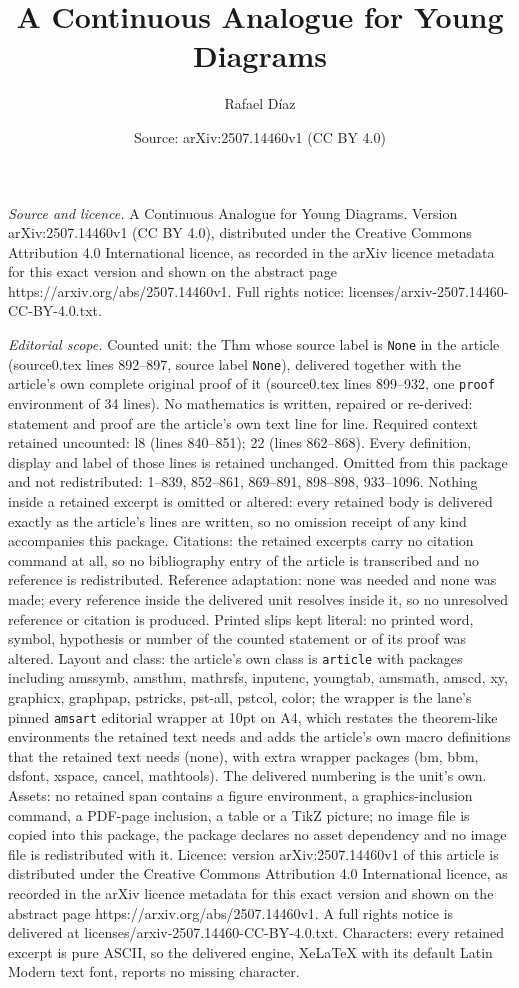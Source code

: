 \documentclass[10pt,a4paper]{amsart}
\title[A Continuous Analogue for Young Diagrams]{A Continuous Analogue for Young Diagrams}
\author{Rafael D\'iaz}
\date{Source: arXiv:2507.14460v1 (CC BY 4.0)}
\begin{document}
\maketitle

\noindent\emph{Source and licence.} A Continuous Analogue for Young Diagrams. Version arXiv:2507.14460v1 (CC BY 4.0), distributed under the Creative Commons Attribution 4.0 International licence, as recorded in the arXiv licence metadata for this exact version and shown on the abstract page https://arxiv.org/abs/2507.14460v1. Full rights notice: licenses/arxiv-2507.14460-CC-BY-4.0.txt.\par\smallskip

\noindent\textit{Editorial scope.} Counted unit: the Thm whose source label is \texttt{None} in the article (source0.tex lines 892--897, source label \texttt{None}), delivered together with the article's own complete original proof of it (source0.tex lines 899--932, one \texttt{proof} environment of 34 lines). No mathematics is written, repaired or re-derived: statement and proof are the article's own text line for line. Required context retained uncounted: l8 (lines 840--851); 22 (lines 862--868). Every definition, display and label of those lines is retained unchanged. Omitted from this package and not redistributed: 1--839, 852--861, 869--891, 898--898, 933--1096. Nothing inside a retained excerpt is omitted or altered: every retained body is delivered exactly as the article's lines are written, so no omission receipt of any kind accompanies this package. Citations: the retained excerpts carry no citation command at all, so no bibliography entry of the article is transcribed and no reference is redistributed. Reference adaptation: none was needed and none was made; every reference inside the delivered unit resolves inside it, so no unresolved reference or citation is produced. Printed slips kept literal: no printed word, symbol, hypothesis or number of the counted statement or of its proof was altered. Layout and class: the article's own class is \texttt{article} with packages including amssymb, amsthm, mathrsfs, inputenc, youngtab, amsmath, amscd, xy, graphicx, graphpap, pstricks, pst-all, pstcol, color; the wrapper is the lane's pinned \texttt{amsart} editorial wrapper at 10pt on A4, which restates the theorem-like environments the retained text needs and adds the article's own macro definitions that the retained text needs (none), with extra wrapper packages (bm, bbm, dsfont, xspace, cancel, mathtools). The delivered numbering is the unit's own. Assets: no retained span contains a figure environment, a graphics-inclusion command, a PDF-page inclusion, a table or a TikZ picture; no image file is copied into this package, the package declares no asset dependency and no image file is redistributed with it. Licence: version arXiv:2507.14460v1 of this article is distributed under the Creative Commons Attribution 4.0 International licence, as recorded in the arXiv licence metadata for this exact version and shown on the abstract page https://arxiv.org/abs/2507.14460v1. A full rights notice is delivered at licenses/arxiv-2507.14460-CC-BY-4.0.txt. Characters: every retained excerpt is pure ASCII, so the delivered engine, XeLaTeX with its default Latin Modern text font, reports no missing character.
\end{document}
